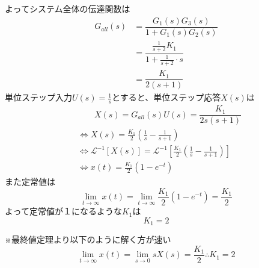 \documentclass[a4paper,12pt]{article}
\begin{document}
\begin{tcolorbox}
\begin{center}
\end{center}
\vspace{-4mm}
よってシステム全体の伝達関数は
\vspace{-4mm}
\begin{align*}
  G_{all}(s) &=\dfrac{G_1(s) G_3(s)}{1 + G_1(s) G_2(s)} \\
            & =\dfrac{\frac{1}{s+2} K_1}{1 +\frac{1}{s+2} \cdot s} \\
            & =\dfrac{K_1}{2(s+1)}
\end{align*}
単位ステップ入力\(U(s)=\frac{1}{s}\)とすると、単位ステップ応答\(X(s)\)は
\vspace{-3mm}
\begin{align*}
    &\qquad X(s) =G_{all}(s) U(s)=\dfrac{K_1}{2s(s+1)} \\
    &\Leftrightarrow X(s) = \frac{K_1}{2}\left(\frac{1}{s} - \frac{1}{s+1} \right) \\
    &\Leftrightarrow \mathcal{L}^{-1} \left[ X(s)  \right]
    =\mathcal{L}^{-1} \left[ \frac{K_1}{2}\left(\frac{1}{s} - \frac{1}{s+1} \right) \right]\\
    &\Leftrightarrow x(t) =  \frac{K_1}{2} \left(1-e^{-t} \right)
\end{align*}
また定常値は
\[
\lim_{t \to \infty} x(t) = \lim_{t \to \infty} \frac{K_1}{2} \left(1-e^{-t} \right) = \frac{K_1}{2}
\]
よって定常値が１になるような\(K_1\)は
\vspace{-3mm}
\[
K_1=2
\]
  \begin{tcolorbox}[title={}]
  ※最終値定理より以下のように解く方が速い
  \[
  \lim_{t \to \infty} x(t) = \lim_{s \to 0} sX(s) = \frac{K_1}{2} \therefore K_1=2
  \]
  \end{tcolorbox}
\end{tcolorbox}

\newpage
\end{document}
